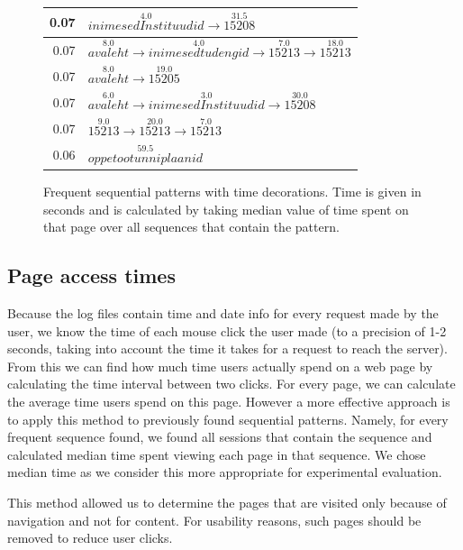 \documentclass[12pt, english,a4paper]{article}
\begin{document}
\begin{figure}[H]
\begin{tabular}{ r | l }
0.07 & $ \overset{4.0}{inimesedInstituudid} \rightarrow \overset{31.5}{15208} $ \\ \hline
0.07 & $ \overset{8.0}{avaleht} \rightarrow \overset{4.0}{inimesedtudengid} \rightarrow \overset{7.0}{15213} \rightarrow \overset{18.0}{15213} $ \\ \hline
0.07 & $ \overset{8.0}{avaleht} \rightarrow \overset{19.0}{15205} $ \\ \hline
0.07 & $ \overset{6.0}{avaleht} \rightarrow \overset{3.0}{inimesedInstituudid} \rightarrow \overset{30.0}{15208} $ \\ \hline
0.07 & $ \overset{9.0}{15213} \rightarrow \overset{20.0}{15213} \rightarrow \overset{7.0}{15213} $ \\ \hline
0.06 & $ \overset{59.5}{oppetootunniplaanid} $ \\ \hline
\end{tabular}
  \caption{Frequent sequential patterns with time decorations. Time is given in seconds and is calculated by taking median value of time spent on that page over all sequences that contain the pattern. }
  \label{frequent_patterns}
\end{figure}



\subsection{Page access times}
Because the log files contain time and date info for every request made by the user, we know the time of each mouse click the user made (to a precision of 1-2 seconds, taking into account the time it takes for a request to reach the server). From this we can find how much time users actually spend on a web page by calculating the time interval between two clicks. For every page, we can calculate the average time users spend on this page. However a more effective approach is to apply this method to previously found sequential patterns. Namely, for every frequent sequence found, we found all sessions that contain the sequence and calculated median time spent viewing each page in that sequence. We chose median time as we consider this more appropriate for experimental evaluation.

This method allowed us to determine the pages that are visited only because of navigation and not for content. For usability reasons, such pages should be removed to reduce user clicks.
\end{document}
